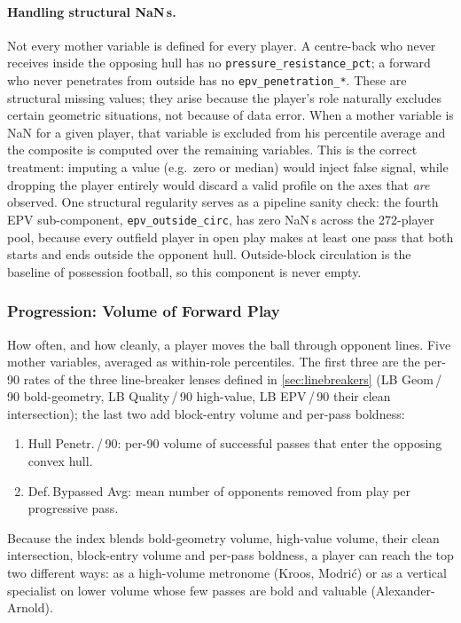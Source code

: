 \documentclass[12pt,a4paper]{article}
\begin{document}
\paragraph{Handling structural NaN\,s.}
Not every mother variable is defined for every player.
A centre-back who never receives inside the opposing hull has no \texttt{pressure\_resistance\_pct}; a forward who never penetrates from outside has no \texttt{epv\_penetration\_*}.
These are structural missing values; they arise because the player's role naturally excludes certain geometric situations, not because of data error.
When a mother variable is NaN for a given player, that variable is excluded from his percentile average and the composite is computed over the remaining variables.
This is the correct treatment: imputing a value (e.g.\ zero or median) would inject false signal, while dropping the player entirely would discard a valid profile on the axes that \emph{are} observed.
One structural regularity serves as a pipeline sanity check: the fourth EPV sub-component, \texttt{epv\_outside\_circ}, has zero NaN\,s across the 272-player pool, because every outfield player in open play makes at least one pass that both starts and ends outside the opponent hull. Outside-block circulation is the baseline of possession football, so this component is never empty.

\subsubsection{Progression: Volume of Forward Play}\label{sec:progression}

How often, and how cleanly, a player moves the ball through opponent lines.
Five mother variables, averaged as within-role percentiles. The first three are the per-90 rates of the three line-breaker lenses defined in \cref{sec:linebreakers} (LB Geom\,/\,90 bold-geometry, LB Quality\,/\,90 high-value, LB EPV\,/\,90 their clean intersection); the last two add block-entry volume and per-pass boldness:

\begin{enumerate}
    \item Hull Penetr.\,/\,90: per-90 volume of successful passes that enter the opposing convex hull.
    \item Def.\,Bypassed Avg: mean number of opponents removed from play per progressive pass.
\end{enumerate}

Because the index blends bold-geometry volume, high-value volume, their clean intersection, block-entry volume and per-pass boldness, a player can reach the top two different ways: as a high-volume metronome (Kroos, Modri\'{c}) or as a vertical specialist on lower volume whose few passes are bold and valuable (Alexander-Arnold).
\end{document}

